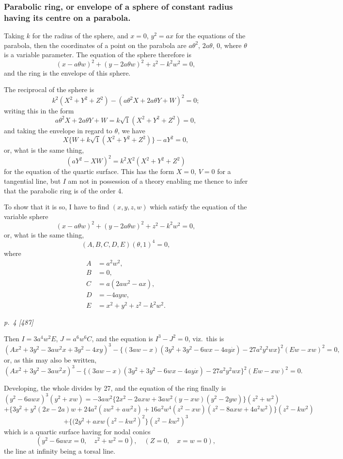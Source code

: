\documentclass[11pt,a4paper]{article}
\theoremstyle{plain}
\theoremstyle{definition}
\begin{document}
\subsubsection*{Parabolic ring, or envelope of a sphere of constant radius having its centre on a parabola.}

Taking $k$ for the radius of the sphere, and $x = 0$, $y^2 = a x$ for the equations of
the parabola, then the coordinates of a point on the parabola are $a\theta^2$, $2a\theta$, $0$, where
$\theta$ is a variable parameter.  The equation of the sphere therefore is
\[
(x - a\theta w)^2 + (y - 2a\theta w)^2 + z^2 - k^2 w^2 = 0,
\]
and the ring is the envelope of this sphere.

The reciprocal of the sphere is
\[
k^2 (X^2 + Y^2 + Z^2) - (a\theta^2 X + 2a\theta Y + W)^2 = 0;
\]
writing this in the form
\[
a\theta^2 X + 2a\theta Y + W = k\sqrt{1}(X^2 + Y^2 + Z^2) = 0,
\]
and taking the envelope in regard to $\theta$, we have
\[
X\{W + k\sqrt{1}(X^2 + Y^2 + Z^2)\} - aY^2 = 0,
\]
or, what is the same thing,
\[
(aY^2 - XW)^2 = k^2 X^2 (X^2 + Y^2 + Z^2)
\]
for the equation of the quartic surface.  This has the form $X = 0$, $V = 0$ for a tangential
line, but $I$ am not in possession of a theory enabling me thence to infer that the
parabolic ring is of the order 4.

To show that it is so, I have to find $(x, y, z, w)$ which satisfy the equation
of the variable sphere
\[
(x - a\theta w)^2 + (y - 2a\theta w)^2 + z^2 - k^2 w^2 = 0,
\]
or, what is the same thing,
\[
(A, B, C, D, E)(\theta, 1)^4 = 0,
\]
where
\begin{align*}
A &= a^2 w^2, \\
B &= 0, \\
C &= a(2aw^2 - ax), \\
D &= -4ayw, \\
E &= x^2 + y^2 + z^2 - k^2 w^2.
\end{align*}

\clearpage

\bigskip
\textit{p.~4 [487]}
\smallskip

Then $I = 3a^4w^2 E$, $J = a^6w^6 C$, and the equation is $I^3 - J^2 = 0$, viz.\ this is
\[
(Ax^2 + 3y^2 - 3aw^2x + 3y^2 - 4xy)^3 - \{(3aw - x)(3y^2 + 3y^2 - 6w x - 4ay\dot{x}) - 27a^2 y^2 w x\}^2 (Ew - x w)^2 = 0,
\]
or, as this may also be written,
\[
(Ax^2 + 3y^2 - 3aw^2 x)^3 - \{(3aw - x)(3y^2 + 3y^2 - 6w x - 4ay\dot{x}) - 27a^2 y^2 w x\}^2 (Ew - x w)^2 = 0.
\]

Developing, the whole divides by 27, and the equation of the ring finally is
\[
(y^2 - 6awx)^3 (y^2 + x w) = -3a w^2 \{2x^2 - 2axw + 3a w^2 (y - x w) (y^2 - 2y w) \} (z^2 + w^2)
\]
\[
+ \{3y^2 + y^2 (2x - 2a) w + 24a^2 (z w^2 + a w^2 z) + 16a^2 w^4 (z^2 - x w) (z^2 - 8a x w + 4a^2 w^2) \} (z^2 - kw^2)
\]
\[
+ \{(2y^2 + a x w (z^2 - kw^2)^2 \}(z^2 - k w^2)^3
\]
which is a quartic surface having for nodal conics
\[
(y^2 - 6awx = 0, \quad z^2 + w^2 = 0), \quad (Z = 0, \quad x = w = 0),
\]
the line at infinity being a torsal line.
\end{document}
